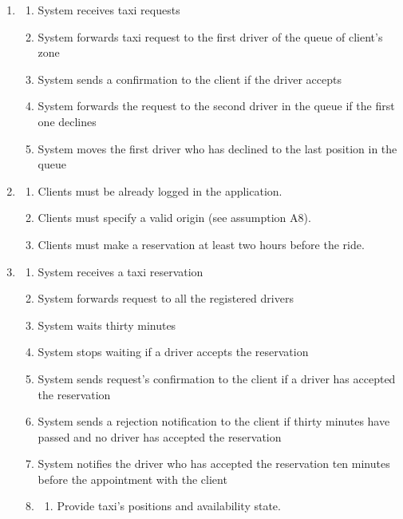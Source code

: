 \documentclass[a4paper]{article}
\begin{document}
\begin{enumerate}[label=\bfseries G\arabic*:]
\begin{enumerate}[label=\bfseries R\arabic*:]
        \end{enumerate}
    \item 
        \begin{enumerate}[label=\bfseries R\arabic*:]
        \item System receives taxi requests
        \item System forwards taxi request to the first driver of the queue of client's zone
        \item System sends a confirmation to the client if the driver accepts
        \item System forwards the request to the second driver in the queue if the first one declines
        \item System moves the first driver who has declined to the last position in the queue
        \end{enumerate}
    \item
        \begin{enumerate}[label=\bfseries R\arabic*:]
        \item Clients must be already logged in the application.
        \item Clients must specify a valid origin (see assumption A8).
        \item Clients must make a reservation at least two hours before the ride.
        \end{enumerate}
    \item
        \begin{enumerate}[label=\bfseries R\arabic*:]
        \item System receives a taxi reservation
        \item System forwards request to all the registered drivers
        \item System waits thirty minutes
        \item System stops waiting if a driver accepts the reservation
        \item System sends request's confirmation to the client if a driver has accepted the reservation
        \item System sends a rejection notification to the client if thirty minutes have passed and no driver has accepted the reservation
        \item System notifies the driver who has accepted the reservation ten minutes before the appointment with the client
    \item
        \begin{enumerate}[label=\bfseries R\arabic*:]
        \item Provide taxi's positions and availability state.
        \end{enumerate}
\end{enumerate}


\end{enumerate}
\end{document}
